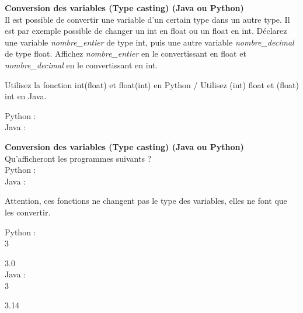 \begin{Exercice}[20 minutes] \textbf{Conversion des variables (Type casting) (Java ou Python)}\\
   Il est possible de convertir une variable d'un certain type dans un autre type. Il est par exemple possible de changer un int en float ou un float en int. Déclarez une variable \textit{nombre\_entier} de type int, puis une autre variable \textit{nombre\_decimal} de type float. Affichez \textit{nombre\_entier} en le convertissant en float et \textit{nombre\_decimal} en le convertissant en int. \\
   
    \begin{conseil}
       Utilisez la fonction int(float) et float(int) en Python / Utilisez (int) float et (float) int en Java.
        
    \end{conseil}
    \begin{solution}
    
    Python : \\
    
    
    
    Java : \\
    
    
           
    \end{solution}   
\end{Exercice}

\begin{Exercice}[20 minutes] \textbf{Conversion des variables (Type casting) (Java ou Python)}\\
   Qu'afficheront les programmes suivants ? \\
   
   Python : \\
   
   
   
   Java : \\
   
   
    
   
    \begin{conseil}
      	Attention, ces fonctions ne changent pas le type des variables, elles ne font que les convertir.
        
    \end{conseil}
    \begin{solution}
     
    Python : \\
    
    3
    
    3.0 \\
    
    Java : \\
    
    3
    
    3.14 \\
           
    \end{solution}   
\end{Exercice}

